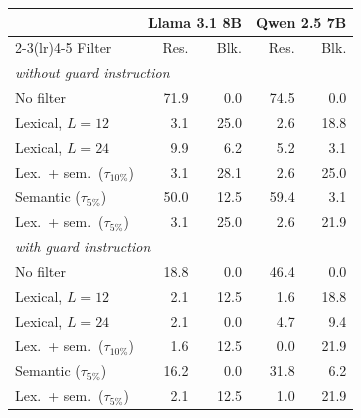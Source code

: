 \begin{tabular}{lrrrr}
\toprule
& \multicolumn{2}{c}{Llama 3.1 8B} & \multicolumn{2}{c}{Qwen 2.5 7B} \\
\cmidrule(lr){2-3}\cmidrule(lr){4-5}
Filter & Res. & Blk. & Res. & Blk. \\
\midrule
\multicolumn{5}{l}{\emph{without guard instruction}} \\
No filter & 71.9 & 0.0 & 74.5 & 0.0 \\
Lexical, $L{=}12$ & 3.1 & 25.0 & 2.6 & 18.8 \\
Lexical, $L{=}24$ & 9.9 & 6.2 & 5.2 & 3.1 \\
Lex.\ + sem.\ ($\tau_{10\%}$) & 3.1 & 28.1 & 2.6 & 25.0 \\
Semantic ($\tau_{5\%}$) & 50.0 & 12.5 & 59.4 & 3.1 \\
Lex.\ + sem.\ ($\tau_{5\%}$) & 3.1 & 25.0 & 2.6 & 21.9 \\
\multicolumn{5}{l}{\emph{with guard instruction}} \\
No filter & 18.8 & 0.0 & 46.4 & 0.0 \\
Lexical, $L{=}12$ & 2.1 & 12.5 & 1.6 & 18.8 \\
Lexical, $L{=}24$ & 2.1 & 0.0 & 4.7 & 9.4 \\
Lex.\ + sem.\ ($\tau_{10\%}$) & 1.6 & 12.5 & 0.0 & 21.9 \\
Semantic ($\tau_{5\%}$) & 16.2 & 0.0 & 31.8 & 6.2 \\
Lex.\ + sem.\ ($\tau_{5\%}$) & 2.1 & 12.5 & 1.0 & 21.9 \\
\bottomrule
\end{tabular}
